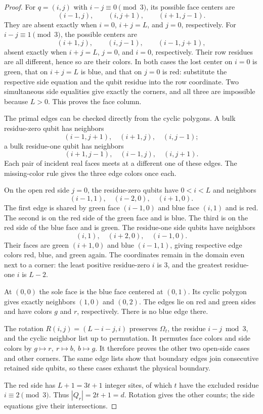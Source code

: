 \documentclass[11pt]{article}
\theoremstyle{definition}
\theoremstyle{plain}
\theoremstyle{remark}
\begin{document}
\begin{proof}
For $q=(i,j)$ with $i-j\equiv0\pmod3$, its possible face centers are
\[
 (i-1,j),\qquad(i,j+1),\qquad(i+1,j-1).
\]
They are absent exactly when $i=0$, $i+j=L$, and $j=0$, respectively.
For $i-j\equiv1\pmod3$, the possible centers are
\[
 (i+1,j),\qquad(i,j-1),\qquad(i-1,j+1),
\]
absent exactly when $i+j=L$, $j=0$, and $i=0$, respectively.
Their row residues are all different, hence so are their colors.
In both cases the lost center on $i=0$ is green, that on $i+j=L$
is blue, and that on $j=0$ is red: substitute the respective side
equation and the qubit residue into the row coordinate.
Two simultaneous side equalities give exactly the corners, and all
three are impossible because $L>0$. This proves the face column.

The primal edges can be checked directly from the cyclic polygons.
A bulk residue-zero qubit has neighbors
\[
 (i-1,j+1),\quad(i+1,j),\quad(i,j-1);
\]
a bulk residue-one qubit has neighbors
\[
 (i+1,j-1),\quad(i-1,j),\quad(i,j+1).
\]
Each pair of incident real faces meets at a different one of these
edges. The missing-color rule gives the three edge colors once each.

On the open red side $j=0$, the residue-zero qubits have $0<i<L$ and
neighbors
\[
 (i-1,1),\quad(i-2,0),\quad(i+1,0).
\]
The first edge is shared by green face $(i-1,0)$ and blue face $(i,1)$
and is red. The second is on the red side of the green face and is
blue. The third is on the red side of the blue face and is green.
The residue-one side qubits have neighbors
\[
 (i,1),\quad(i+2,0),\quad(i-1,0).
\]
Their faces are green $(i+1,0)$ and blue $(i-1,1)$, giving respective
edge colors red, blue, and green again.
The coordinates remain in the domain even next to a corner: the
least positive residue-zero $i$ is $3$, and the greatest residue-one
$i$ is $L-2$.

At $(0,0)$ the sole face is the blue face centered at $(0,1)$.
Its cyclic polygon gives exactly neighbors $(1,0)$ and $(0,2)$.
The edges lie on red and green sides and have colors $g$ and $r$,
respectively. There is no blue edge there.

The rotation $R(i,j)=(L-i-j,i)$ preserves $\Omega_t$, the residue
$i-j\bmod3$, and the cyclic neighbor list up to permutation.
It permutes face colors and side colors by
$g\mapsto r,\ r\mapsto b,\ b\mapsto g$.
It therefore proves the other two open-side cases and other corners.
The same edge lists show that boundary edges join consecutive retained
side qubits, so these cases exhaust the physical boundary.

The red side has $L+1=3t+1$ integer sites, of which $t$ have the
excluded residue $i\equiv2\pmod3$. Thus $|Q_r|=2t+1=d$.
Rotation gives the other counts; the side equations give their intersections.
\end{proof}
\end{document}
